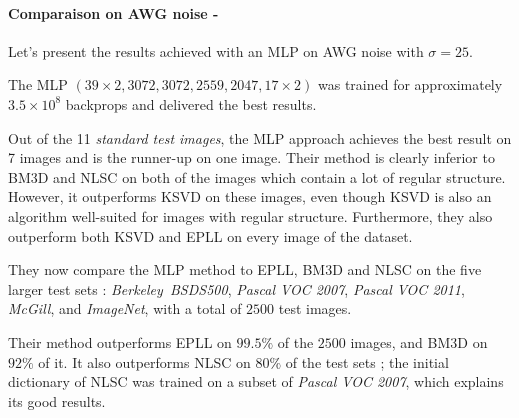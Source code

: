\documentclass[10pt,a4paper]{article}
\newcommand{\svs}{\vspace{9pt}}
\newcommand{\ourparagraph}[1]{\paragraph{#1}}
\begin{document}
\ourparagraph{Comparaison on AWG noise -}{
Let's present the results achieved with an MLP on AWG noise with $\sigma=25$.

\svs 

The MLP $(39 \times 2, 3072, 3072, 2559, 2047, 17 \times 2)$ was trained for approximately $3.5 \times 10^8$ backprops and delivered the best results.

\svs 

Out of the 11 \textit{standard test images}, the MLP approach achieves the best result on 7 images and is the runner-up on one image.
Their method is clearly inferior to BM3D and NLSC on both of the images which contain a lot of regular structure. However, it outperforms KSVD on these images, even though KSVD is also an algorithm well-suited for images with regular structure. Furthermore, they also outperform both KSVD and EPLL on every image of the dataset.

\svs

They now compare the MLP method to EPLL, BM3D and NLSC on the five larger test sets : \textit{Berkeley\ BSDS500}, \textit{Pascal VOC 2007}, \textit{Pascal VOC 2011}, \textit{McGill}, and \textit{ImageNet}, with a total of $2500$ test images.

\svs

Their method outperforms EPLL on $99.5\%$ of the $2500$ images, and BM3D on $92\%$ of it. It also outperforms NLSC on $80\%$ of the test sets ; the initial dictionary of NLSC was trained on a subset of \textit{Pascal VOC 2007}, which explains its good results.}
\end{document}
